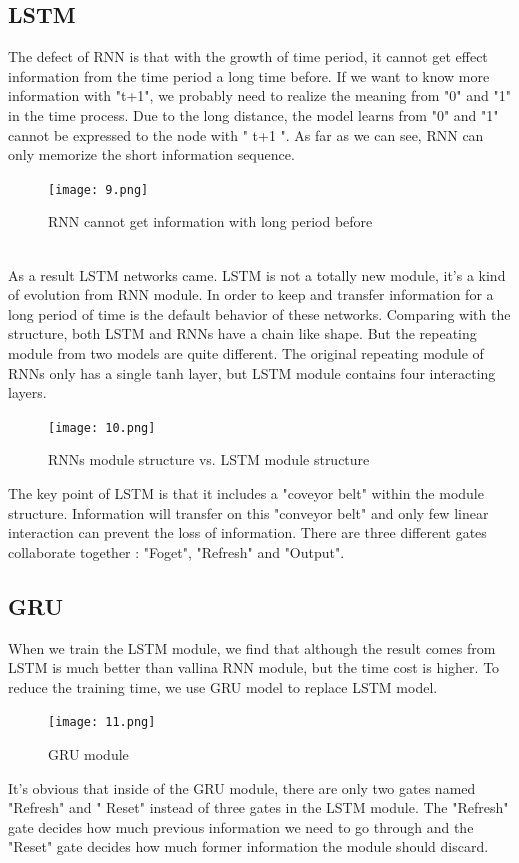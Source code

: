 \documentclass{article}
\begin{document}
\subsection{LSTM}
\noindent The defect of RNN is that with the growth of time period, it cannot get effect information from the time period a long time before. If we want to know more information with "t+1", we probably need to realize the meaning from "0" and "1" in the time process. Due to the long distance, the model learns from "0" and "1" cannot be expressed to the node with " t+1 ". As far as we can see, RNN can only memorize the short information sequence.
\begin{figure}[h]
	\centering
	\texttt{[image: 9.png]}
	\caption{RNN cannot get information with long period before}
\end{figure}\\
\noindent As a result LSTM networks came. LSTM is not a totally new module, it's a kind of evolution from RNN module. In order to keep and transfer information for a long period of time is the default behavior of these networks. Comparing with the structure, both LSTM and RNNs have a chain like shape. But the repeating module from two models are quite different. The original repeating module of RNNs only has a single tanh layer, but LSTM module contains four interacting layers.
\begin{figure}[H]
	\centering
	\texttt{[image: 10.png]}
	\caption{RNNs module structure vs. LSTM module structure}
\end{figure}
\noindent The key point of LSTM is that it includes a "coveyor belt" within the module structure. Information will transfer on this "conveyor belt" and only few linear interaction can prevent the loss of information. There are three different gates collaborate together : "Foget", "Refresh" and "Output". \\
\subsection{GRU}
\noindent When we train the LSTM module, we find that although the result comes from LSTM is much better than vallina RNN module, but the time cost is  higher. To reduce the training time, we use GRU model to replace LSTM model.
\begin{figure}[H]
	\centering
	\texttt{[image: 11.png]}
	\caption{GRU module}
\end{figure}
\noindent It's obvious that inside of the GRU module, there are only two gates named "Refresh" and " Reset" instead of three gates in the LSTM module. The "Refresh" gate decides how much previous information we need to go through and the "Reset" gate decides how much former information the module should discard.\\
\end{document}
